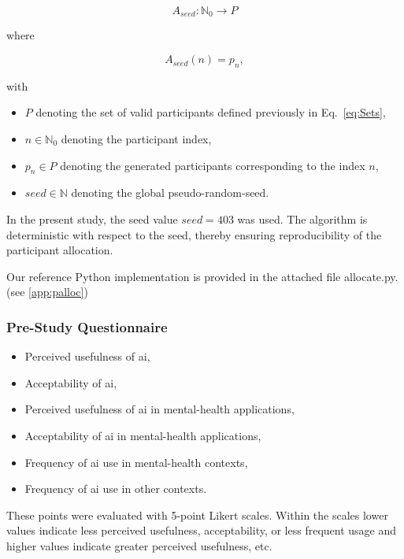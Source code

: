 \documentclass[sigconf,natbib=false]{acmart}
\begin{document}
\begin{equation*}
A_{seed} : \mathbb{N}_0 \to P
\end{equation*}

where

\begin{equation}
A_{seed}(n) = p_n,
\label{eq:A}
\end{equation}

with

\begin{itemize}
    \item \(P\) denoting the set of valid participants defined previously in Eq.~\eqref{eq:Sets},
    \item \(n \in \mathbb{N}_0\) denoting the participant index,
    \item \(p_n \in P\) denoting the generated participants corresponding to the index \(n\),
    \item \({seed} \in \mathbb{N}\) denoting the global \gls{pseudo-random-seed}.
\end{itemize}

In the present study, the seed value \({seed} = 403\) was used.
The algorithm is deterministic with respect to the seed, thereby ensuring reproducibility of the participant allocation.

Our reference Python implementation is provided in the attached file allocate.py.
(see \ref{app:palloc})

\subsubsection{Pre-Study Questionnaire}
\label{sec:def:PSQ}
\begin{itemize}
\item Perceived usefulness of \Gls{ai},
\item Acceptability of \Gls{ai},
\item Perceived usefulness of \Gls{ai} in mental-health applications,
\item Acceptability of \Gls{ai} in mental-health applications,
\item Frequency of \Gls{ai} use in mental-health contexts,
\item Frequency of \Gls{ai} use in other contexts.
\end{itemize}
These points were evaluated with 5-point Likert scales.
Within the scales lower values indicate less perceived usefulness,  acceptability, or less frequent usage and higher values indicate greater perceived usefulness, etc.
\end{document}
